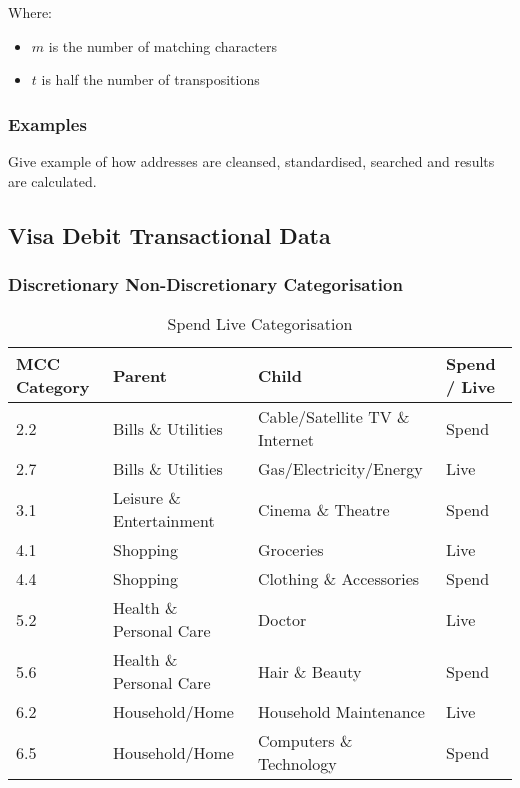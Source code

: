 Where: 
\vspace{-7mm} 
\begin{itemize}
	\item $m$ is the number of matching characters 
 	\item $t$ is half the number of transpositions
\end{itemize}

\subsubsection{Examples}
Give example of how addresses are cleansed, standardised, searched and results are calculated.

\subsection{Visa Debit Transactional Data}
\subsubsection{Discretionary Non-Discretionary Categorisation}

\begin{table}[H]
	\centering
	\resizebox{\textwidth}{!}
	{
	\label{my-label}
	\begin{tabular}{|l|l|l|l|}
		\hline
		\textbf{MCC Category} & \textbf{Parent}          & \textbf{Child}                 & \textbf{Spend / Live} \\ \hline
		2.2                   & Bills \& Utilities       & Cable/Satellite TV \& Internet & Spend                 \\ \hline
		2.7                   & Bills \& Utilities       & Gas/Electricity/Energy         & Live                  \\ \hline
		3.1                   & Leisure \& Entertainment & Cinema \& Theatre              & Spend                 \\ \hline
		4.1                   & Shopping                 & Groceries                     & Live                  \\ \hline
		4.4                   & Shopping                 & Clothing \& Accessories        & Spend                 \\ \hline
		5.2                   & Health \& Personal Care  & Doctor                         & Live                  \\ \hline
		5.6                   & Health \& Personal Care  & Hair \& Beauty                 & Spend                 \\ \hline
		6.2                   & Household/Home           & Household Maintenance          & Live                  \\ \hline
		6.5                   & Household/Home           & Computers \& Technology        & Spend                 \\ \hline
	\end{tabular}
	}
	\caption{Spend Live Categorisation }
\end{table}




